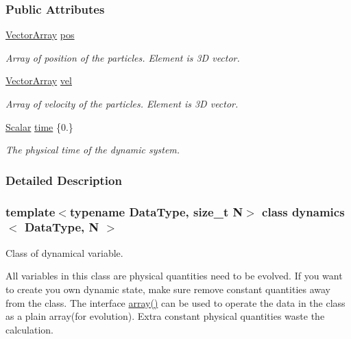 \subsubsection*{Public Attributes}
\begin{DoxyCompactItemize}
\item 
\mbox{\hyperlink{classdynamics_a41e25703d6668a66d96a1db3dc5df03b}{Vector\+Array}} \mbox{\hyperlink{classdynamics_a79f983dcbf7107058280f798ab419b69}{pos}}
\begin{DoxyCompactList}\small\item\em Array of position of the particles. Element is 3D vector. \end{DoxyCompactList}\item 
\mbox{\hyperlink{classdynamics_a41e25703d6668a66d96a1db3dc5df03b}{Vector\+Array}} \mbox{\hyperlink{classdynamics_a211067eb96b01c17d2fc73d1fc65d595}{vel}}
\begin{DoxyCompactList}\small\item\em Array of velocity of the particles. Element is 3D vector. \end{DoxyCompactList}\item 
\mbox{\hyperlink{classdynamics_a444c7534e86115117798563cb0e43cde}{Scalar}} \mbox{\hyperlink{classdynamics_a95cb1723922c4224bf5d1118eed46c0c}{time}} \{0.\}
\begin{DoxyCompactList}\small\item\em The physical time of the dynamic system. \end{DoxyCompactList}\end{DoxyCompactItemize}


\subsubsection{Detailed Description}
\subsubsection*{template$<$typename Data\+Type, size\+\_\+t N$>$\newline
class dynamics$<$ Data\+Type, N $>$}

Class of dynamical variable. 

All variables in this class are physical quantities need to be evolved. If you want to create you own dynamic state, make sure remove constant quantities away from the class. The interface \mbox{\hyperlink{classdynamics_add2d27f86c6f415999e9e7dd05cc8025}{array()}} can be used to operate the data in the class as a plain array(for evolution). Extra constant physical quantities waste the calculation. 

